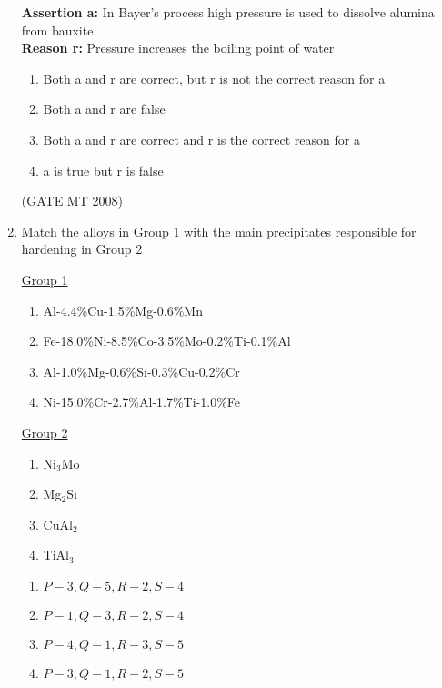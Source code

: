 \documentclass[11pt, letterpaper]{article}
\theoremstyle{remark}
\begin{document}
\begin{enumerate}[label=Q.\arabic*]
      \textbf{Assertion a:} In Bayer's process high pressure is used to dissolve alumina from bauxite \\
      \textbf{Reason r:} Pressure increases the boiling point of water
    
    \begin{multicols}{2}
        \begin{enumerate}[label=(\MakeUppercase{\alph*})]
            \item Both a and r are correct, but r is not the correct reason for a
            \item Both a and r are false
            \item Both a and r are correct and r is the correct reason for a
            \item a is true but r is false
        \end{enumerate}
    \end{multicols}
  \hfill(GATE MT 2008) 
 
\item Match the alloys in Group 1 with the main precipitates responsible for hardening in Group 2
\begin{multicols}{2}
    \underline{Group 1}
    \begin{enumerate}[label=(\Alph*), start=16]
        \item Al-4.4\%Cu-1.5\%Mg-0.6\%Mn
        \item Fe-18.0\%Ni-8.5\%Co-3.5\%Mo-0.2\%Ti-0.1\%Al
        \item Al-1.0\%Mg-0.6\%Si-0.3\%Cu-0.2\%Cr
        \item Ni-15.0\%Cr-2.7\%Al-1.7\%Ti-1.0\%Fe
    \end{enumerate}

     \underline{Group 2}
    \begin{enumerate}[label=(\arabic*), start=1]
        \item Ni$_3$Mo
        \item Mg$_2$Si
        \item CuAl$_2$ 
        \item TiAl$_3$
    \end{enumerate}
\end{multicols}
\vspace{-2em}
     \begin{multicols}{2}
        \begin{enumerate}[label=(\MakeUppercase{\alph*})]
            \item $P-3, Q-5, R-2, S-4$
            \item $P-1, Q-3, R-2, S-4$
            \item $P-4, Q-1, R-3, S-5$
            \item $P-3, Q-1, R-2, S-5$
        \end{enumerate}
    \end{multicols}
    

\end{enumerate}
\end{document}
